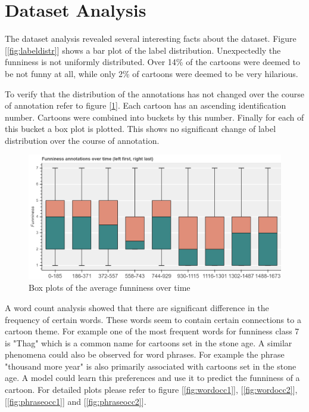 \documentclass[draft,final,oneside]{vutinfth} %
\begin{document}
\section{Dataset Analysis}

The dataset analysis revealed several interesting facts about the dataset. Figure [\ref{fig:labeldistr}] shows a bar plot of the label distribution. Unexpectedly the funniness is not uniformly distributed. Over 14\% of the cartoons were deemed to be not funny at all, while only 2\% of cartoons were deemed to be very hilarious.

To verify that the distribution of the annotations has not changed over the course of annotation refer to figure [\ref{fig:boxplottime}]. Each cartoon has an ascending identification number. Cartoons were  combined into buckets by this number. Finally for each of this bucket a box plot is plotted. This shows no significant change of label distribution over the course of annotation.

\begin{figure}
	\centering
  	\includegraphics[width=1.0\textwidth]{graphics/average_funniness_over_time}
	\caption{Box plots of the average funniness over time}
	\label{fig:boxplottime}
\end{figure}

A word count analysis showed that there are significant difference in the frequency of certain words. These words seem to contain certain connections to a cartoon theme. For example one of the most frequent words for funniness class 7 is "Thag" which is a common name for cartoons set in the stone age. A similar phenomena could also be observed for word phrases. For example the phrase "thousand more year" is also primarily associated with cartoons set in the stone age. A model could learn this preferences and use it to predict the funniness of a cartoon. For detailed plots please refer to figure [\ref{fig:wordocc1}], [\ref{fig:wordocc2}], [\ref{fig:phraseocc1}] and [\ref{fig:phraseocc2}].
\end{document}
